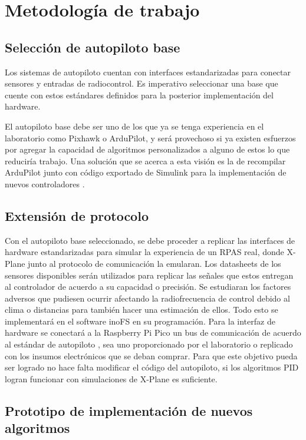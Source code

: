 \section{Metodología de trabajo}

\subsection{Selección de autopiloto base}

Los sistemas de autopiloto cuentan con interfaces estandarizadas para conectar sensores y entradas de radiocontrol. Es imperativo seleccionar una base que cuente con estos estándares definidos para la posterior implementación del hardware.

El autopiloto base debe ser uno de los que ya se tenga experiencia en el laboratorio como Pixhawk o ArduPilot, y será provechoso si ya existen esfuerzos por agregar la capacidad de algoritmos personalizados a alguno de estos lo que reduciría trabajo. Una solución que se acerca a esta visión es la de recompilar ArduPilot junto con código exportado de Simulink para la implementación de nuevos controladores \cite{ardupilot-custom}.

\subsection{Extensión de protocolo}

Con el autopiloto base seleccionado, se debe proceder a replicar las interfaces de hardware estandarizadas para simular la experiencia de un RPAS real, donde X-Plane junto al protocolo de comunicación la emularan. Los datasheets de los sensores disponibles serán utilizados para replicar las señales que estos entregan al controlador de acuerdo a su capacidad o precisión. Se estudiaran los factores adversos que pudiesen ocurrir afectando la radiofrecuencia de control debido al clima o distancias para también hacer una estimación de ellos. Todo esto se implementará en el software inoFS \cite{inofs} en su programación. Para la interfaz de hardware se conectará a la Raspberry Pi Pico un bus de comunicación de acuerdo al estándar de autopiloto \cite{px4-bus}, sea uno proporcionado por el laboratorio o replicado con los insumos electrónicos que se deban comprar. Para que este objetivo pueda ser logrado no hace falta modificar el código del autopiloto, si los algoritmos PID logran funcionar con simulaciones de X-Plane es suficiente.

\subsection{Prototipo de implementación de nuevos algoritmos}

